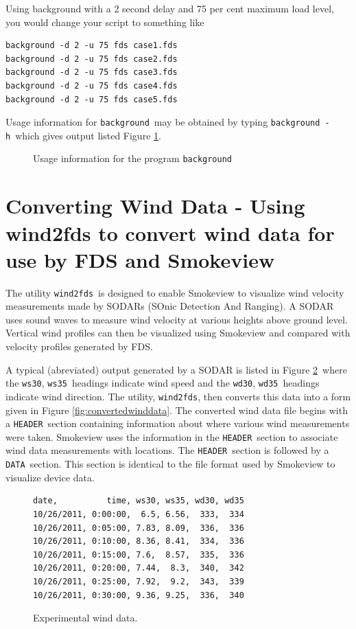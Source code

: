 \documentclass[11pt,twoside]{book}
\begin{document}
Using background with a 2 second delay and 75 per cent maximum
load level, you would change your script to something like

\begin{lstlisting}
background -d 2 -u 75 fds case1.fds
background -d 2 -u 75 fds case2.fds
background -d 2 -u 75 fds case3.fds
background -d 2 -u 75 fds case4.fds
background -d 2 -u 75 fds case5.fds
\end{lstlisting}

Usage information for {\tt background}\ may be obtained
by typing {\tt background -h}\ which gives output listed Figure \ref{fig:background}.

\begin{figure}[bph]
{\small

}
\caption {Usage information for the program {\tt background}}
\label{fig:background}%
\end{figure}

\section{Converting Wind Data - Using wind2fds to convert wind data for use by FDS and Smokeview}
The utility {\tt wind2fds}\ is designed to enable Smokeview to visualize wind velocity measurements made by SODARs
(SOnic Detection And Ranging).
A SODAR uses sound waves to measure wind velocity at various heights above ground level.
Vertical wind profiles can then be visualized using Smokeview and compared with velocity profiles generated by FDS.

A typical (abreviated) output generated by a SODAR is listed in Figure \ref{fig:winddata}\ where
the {\tt ws30}, {\tt ws35}\ headings indicate wind speed
and the {\tt wd30}, {\tt wd35}\ headings indicate wind direction.
The utility, {\tt wind2fds}, then converts this data into a form given in Figure \ref{fig:convertedwinddata}.
The converted wind data file begins with a {\tt HEADER}\ section
containing information about where various wind measurements were taken. Smokeview uses the information in the {\tt HEADER}\ section to associate wind data measurements with locations. The {\tt HEADER}\ section is followed by a {\tt DATA}\ section.  This section is identical
to the file format used by Smokeview to visualize device data.

\begin{figure}[bph]
{\small
\begin{verbatim}
date,          time, ws30, ws35, wd30, wd35
10/26/2011, 0:00:00,  6.5, 6.56,  333,  334
10/26/2011, 0:05:00, 7.83, 8.09,  336,  336
10/26/2011, 0:10:00, 8.36, 8.41,  334,  336
10/26/2011, 0:15:00, 7.6,  8.57,  335,  336
10/26/2011, 0:20:00, 7.44,  8.3,  340,  342
10/26/2011, 0:25:00, 7.92,  9.2,  343,  339
10/26/2011, 0:30:00, 9.36, 9.25,  336,  340
\end{verbatim}
}
\caption {Experimental wind data.}
\label{fig:winddata}%
\end{figure}
\end{document}
